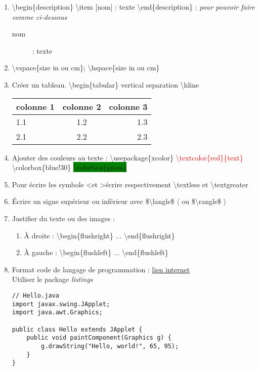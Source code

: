 \documentclass[12pt, letterpaper]{article}
\begin{document}
\begin{enumerate}
\item \textbackslash begin\{description\} \textbackslash item [nom] : texte \textbackslash end\{description\} : \textit{pour pouvoir faire comme ci-dessous}
\begin{description}
\item [nom] : texte
\end{description}
\item \textbackslash vspace\{size in ou cm\}; \textbackslash hspace\{size in ou cm\}
\item Créer un tableau. \textbackslash begin\{tabular\} vertical separation \textbackslash hline
\newline \begin{tabular}{|l|c|r|}
  \hline
  colonne 1 & colonne 2 & colonne 3 \\
  \hline
  1.1 & 1.2 & 1.3 \\ \hline
  2.1 & 2.2 & 2.3 \\
  \hline
\end{tabular}
\item Ajouter des couleurs au texte : \textbackslash usepackage\{xcolor\}
\newline \textcolor{red}{\textbackslash textcolor\{red\}\{text\}}
\newline \colorbox{blue!30}{\textbackslash colorbox\{blue!30\}}
\newline \colorbox{green}{\textbackslash colorbox\{green\}}
\item Pour écrire les symbole \textless et \textgreater écrire respectivement \textbackslash textless et \textbackslash textgreater
\item Écrire un signe supérieur ou inférieur avec \$\textbackslash langle\$ $\langle$ ou \$\textbackslash rangle\$ $\rangle$
\item Justifier du texte ou des images :
\begin{enumerate}
\item À droite : \textbackslash begin\{flushright\} ... \textbackslash end\{flushright\}
\item À gauche : \textbackslash begin\{flushleft\} ... \textbackslash end\{flushleft\}
\end{enumerate}
\item Format code de langage de programmation : \href{https://ctan.org/tex-archive/macros/latex/contrib/listings/}{lien internet}\\
Utiliser le package \textit{listings}
\begin{lstlisting}
// Hello.java
import javax.swing.JApplet;
import java.awt.Graphics;

public class Hello extends JApplet {
    public void paintComponent(Graphics g) {
        g.drawString("Hello, world!", 65, 95);
    }    
}
\end{lstlisting}
\end{enumerate}
\end{document}
